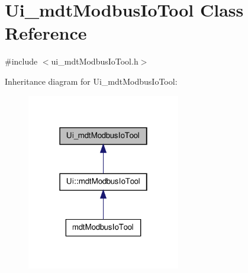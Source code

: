 \hypertarget{class_ui__mdt_modbus_io_tool}{\section{Ui\-\_\-mdt\-Modbus\-Io\-Tool Class Reference}
\label{class_ui__mdt_modbus_io_tool}
}


{\ttfamily \#include $<$ui\-\_\-mdt\-Modbus\-Io\-Tool.\-h$>$}



Inheritance diagram for Ui\-\_\-mdt\-Modbus\-Io\-Tool\-:
\nopagebreak
\begin{figure}[H]
\begin{center}
\leavevmode
\includegraphics[width=190pt]{class_ui__mdt_modbus_io_tool__inherit__graph}
\end{center}
\end{figure}


